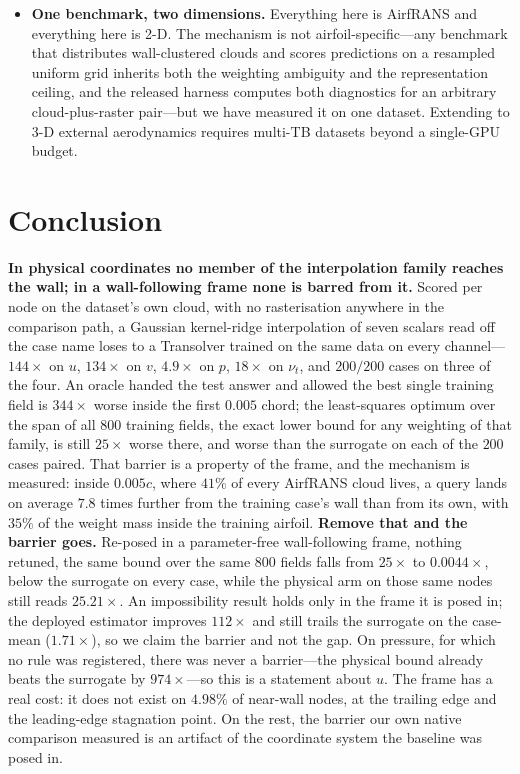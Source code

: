 \begin{itemize}
\item \textbf{One benchmark, two dimensions.} Everything here is AirfRANS and everything
here is 2-D. The mechanism is not airfoil-specific---any benchmark that distributes
wall-clustered clouds and scores predictions on a resampled uniform grid inherits both the
weighting ambiguity and the representation ceiling, and the released harness computes both
diagnostics for an arbitrary cloud-plus-raster pair---but we have measured it on one
dataset. Extending to 3-D external aerodynamics
\citep{ahmedml2024,elrefaie2024drivaernet} requires multi-TB datasets beyond a single-GPU
budget.
\end{itemize}

\section{Conclusion}

\textbf{In physical coordinates no member of the interpolation family reaches the wall; in a
wall-following frame none is barred from it.} Scored per node on the dataset's own cloud,
with no rasterisation anywhere in the comparison path, a Gaussian kernel-ridge
interpolation of seven scalars read off the case name loses to a Transolver trained on the
same data on every channel---$144\times$ on $u$, $134\times$ on $v$, $4.9\times$ on $p$, $18\times$ on
$\nu_t$, and $200/200$ cases on three of the four. An oracle handed the test answer and
allowed the best single training field is $344\times$ worse inside the first $0.005$ chord;
the least-squares optimum over the span of all $800$ training fields, the exact lower bound
for any weighting of that family, is still $25\times$ worse there, and worse than the
surrogate on each of the $200$ cases paired. That barrier is a property of the frame, and
the mechanism is measured: inside $0.005c$, where $41\%$ of
every AirfRANS cloud lives, a query lands on average $7.8$ times further from the training
case's wall than from its own, with $35\%$ of the weight mass inside the training airfoil.
\textbf{Remove that and the barrier goes.} Re-posed in a parameter-free wall-following
frame, nothing retuned, the same bound over the same $800$ fields falls from $25\times$ to
$0.0044\times$, below the surrogate on every case, while the physical arm on those same
nodes still reads $25.21\times$. An impossibility result holds only in the frame it is posed
in; the deployed estimator improves $112\times$ and still trails the surrogate on the
case-mean ($1.71\times$), so we claim the barrier and not the gap. On pressure, for which no
rule was registered, there was never a barrier---the physical bound already beats the
surrogate by $974\times$---so this is a statement about $u$. The frame has a real cost: it
does not exist on $4.98\%$ of near-wall nodes, at the trailing edge and the leading-edge
stagnation point. On the rest, the barrier our own native comparison measured is an
artifact of the coordinate system the baseline was posed in.

